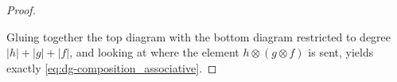 \begin{proof}
\begin{center}
    \end{center}
    Gluing together the top diagram with the bottom diagram restricted to degree \( |h| + |g| + |f| \), and looking at where the element \( h \otimes (g \otimes f) \) is sent, yields exactly \autoref{eq:dg-composition_associative}.
\end{proof}

